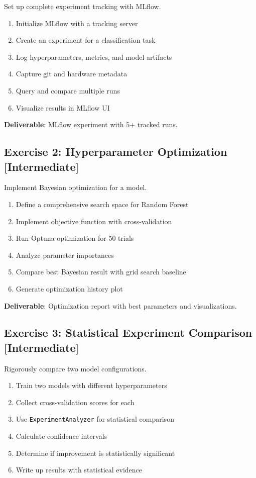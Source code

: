Set up complete experiment tracking with MLflow.

\begin{enumerate}
    \item Initialize MLflow with a tracking server
    \item Create an experiment for a classification task
    \item Log hyperparameters, metrics, and model artifacts
    \item Capture git and hardware metadata
    \item Query and compare multiple runs
    \item Visualize results in MLflow UI
\end{enumerate}

\textbf{Deliverable}: MLflow experiment with 5+ tracked runs.

\subsection{Exercise 2: Hyperparameter Optimization [Intermediate]}

Implement Bayesian optimization for a model.

\begin{enumerate}
    \item Define a comprehensive search space for Random Forest
    \item Implement objective function with cross-validation
    \item Run Optuna optimization for 50 trials
    \item Analyze parameter importances
    \item Compare best Bayesian result with grid search baseline
    \item Generate optimization history plot
\end{enumerate}

\textbf{Deliverable}: Optimization report with best parameters and visualizations.

\subsection{Exercise 3: Statistical Experiment Comparison [Intermediate]}

Rigorously compare two model configurations.

\begin{enumerate}
    \item Train two models with different hyperparameters
    \item Collect cross-validation scores for each
    \item Use \texttt{ExperimentAnalyzer} for statistical comparison
    \item Calculate confidence intervals
    \item Determine if improvement is statistically significant
    \item Write up results with statistical evidence
\end{enumerate}

